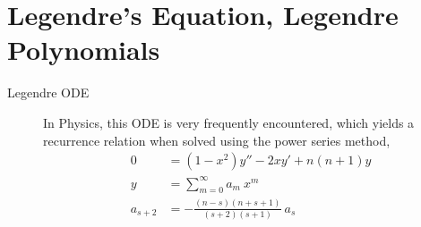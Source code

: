 \section{Legendre's Equation, Legendre Polynomials}
\begin{description}
    \item[Legendre ODE] In Physics, this ODE is very frequently encountered, which
        yields a recurrence relation when solved using the power series method,
        \begin{align}
            0       & = (1 - x^2)y'' - 2xy' + n(n+1)y         \\
            y       & = \sum_{m = 0}^{\infty} a_m\ x^m        \\
            a_{s+2} & = -\frac{(n-s)(n+s+1)}{(s+2)(s+1)}\ a_s \\
        \end{align}


\end{description}
